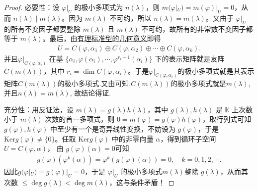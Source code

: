 \documentclass[../../main.tex]{subfiles}%
\begin{document}
\begin{proof}

{\heiti 必要性：}设 $\varphi|_U$ 的极小多项式为 $n(\lambda)$，则 $m(\varphi|_U)=m(\varphi)|_U = 0$，从而 $n(\lambda)\mid m(\lambda)$。因为 $m(\lambda)$ 不可约，所以 $n(\lambda)=m(\lambda)$。又由于 $\varphi|_U$ 的所有不变因子都要整除 $m(\lambda)$ 且 $m(\lambda)$ 不可约，故所有的非常数不变因子都等于 $m(\lambda)$。最后，由\hyperref[theorem:有理标准型的几何意义]{有理标准型的几何意义}即得
\begin{align*}
U = C(\varphi,\alpha_1)\oplus C(\varphi,\alpha_2)\oplus\cdots\oplus C(\varphi,\alpha_k).
\end{align*}
并且\(\varphi|_{C(\varphi,\alpha_i)}\) 在基 \(\{\alpha_i,\varphi(\alpha_i),\cdots,\varphi^{r_i - 1}(\alpha_i)\}\) 下的表示矩阵就是友阵 \(C(m(\lambda))\)，其中 \(r_i = \dim C(\varphi,\alpha_i)\)。于是\(\varphi|_{C(\varphi,\alpha_i)}\)的极小多项式就是其表示矩阵\(C(m(\lambda))\)的极小多项式.又由可知,\(C(m(\lambda))\)的极小多项式就是$m(\lambda)$,并且$n(\lambda)=m(\lambda)$,
故结论得证.

{\heiti 充分性：}用反证法，设 $m(\lambda)=g(\lambda)h(\lambda)$，其中 $g(\lambda),h(\lambda)$ 是 $\mathbb{K}$ 上次数小于 $m(\lambda)$ 次数的首一多项式，则 $0=m(\varphi)=g(\varphi)h(\varphi)$，取行列式可知 $g(\varphi),h(\varphi)$ 中至少有一个是奇异线性变换，不妨设为 $g(\varphi)$，于是 $\mathrm{Ker}g(\varphi)\neq \{0\}$。任取 $\mathrm{Ker}g(\varphi)$ 中的非零向量 $\alpha$，得到循环子空间 $U = C(\varphi,\alpha)$，
由 $g(\varphi)(\alpha)=0$可知
\begin{align*}
g(\varphi )(\varphi ^k\left( \alpha \right) )=\varphi ^k\left( g\left( \varphi \right) \left( \alpha \right) \right) =0,\quad k=0,1,2,\cdots .
\end{align*}
因此$g(\varphi|_U)=g(\varphi)|_U = 0$，于是 $\varphi|_U$ 的极小多项式$m(\lambda)$整除 $g(\lambda)$，从而其次数 $\leqslant \deg g(\lambda)<\deg m(\lambda)$，这与条件矛盾！
\end{proof}
\end{document}
